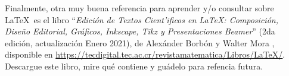 \documentclass[11pt]{exam}
\begin{document}
\begin{questions}
\item Finalmente, otra muy buena referencia para aprender y/o consultar sobre \LaTeX\ es el libro ``\textit{Edición de Textos Cient'ificos en \LaTeX: Composición, Dise\~no Editorial, Gráficos, Inkscape, Tikz y Presentaciones Beamer}'' (2da edición, actualización Enero 2021), de Alexánder Borbón y Walter Mora , disponible en \url{https://tecdigital.tec.ac.cr/revistamatematica/Libros/LaTeX/}. Descargue este libro, mire qué contiene y guádelo para refencia futura.
\end{questions}
\end{document}
